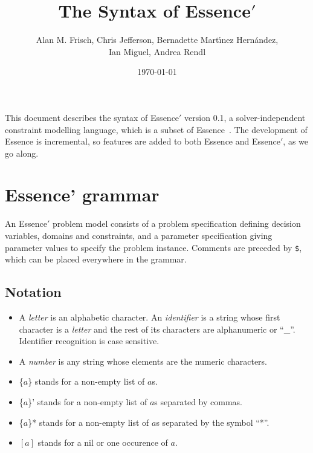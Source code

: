 \documentclass{article}
\begin{document}
\title{The Syntax of {\sc Essence}$'$} %

\author{Alan M. Frisch, Chris Jefferson, Bernadette  Mart\'{\i}nez Hern{\'a}ndez,\\ Ian Miguel, Andrea Rendl} %


\date{\today}

\maketitle


This document describes the syntax of  {\sc Essence}$'$ version 0.1, a solver-independent constraint modelling language,
which is a subset of {\sc Essence}~\cite{essence}. The development of {\sc Essence} is incremental, 
so features are added to both {\sc Essence} and {\sc Essence}$'$, as we go along. 

\section{{\sc Essence'} grammar}

An {\sc Essence}$'$ problem model 
consists of a problem specification defining decision variables, domains and constraints, 
and a parameter specification giving parameter values to specify the problem instance. 
Comments are preceded by {\tt \$}, which can be placed everywhere in the grammar. 

\subsection{Notation}

\begin{itemize}

  \item A \textit{letter} is an alphabetic character. An \textit{identifier} is 
    a string whose first character is a \textit{letter} and the rest of its characters 
    are alphanumeric or ``\_''.  Identifier recognition is case sensitive. 

  \item A \textit{number} is any string whose elements are the numeric characters.
  \item \{$a$\} stands for a non-empty list of $a$s.
  \item \{$a$\}' stands for a non-empty list of $a$s separated by commas.
  \item \{$a$\}* stands for a non-empty list of $a$s separated by the symbol ``*''.
  \item $[a]$ stands for a nil or one occurence of $a$.

\end{itemize}
\end{document}
